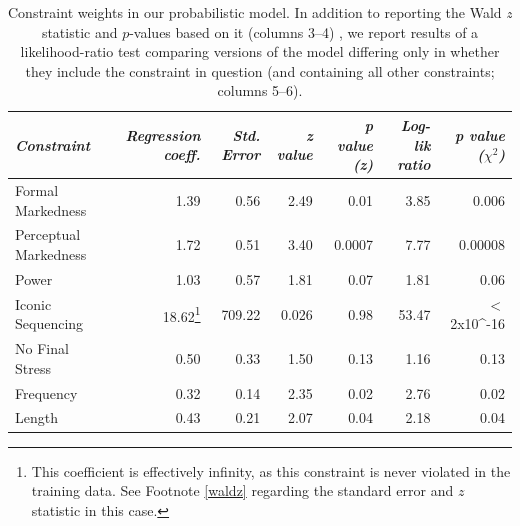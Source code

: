 \documentclass[authoryear]{elsarticle}
\begin{document}
\begin{table}[t]
\begin{minipage}[t]{\textwidth}


\renewcommand*\footnoterule{}


\centering
\begin{tabular}{ l  r  r  r  r r r }
\hline\hline
\emph{Constraint} & \emph{Regression coeff.} &\emph{Std. Error} & \emph{z value} & \emph{p value (z)} & \emph{Log-lik ratio} & \emph{p value ($\chi^{2}$)}\\\hline    
 Formal Markedness   & 1.39     & 0.56   & 2.49  & 0.01 & 3.85 & 0.006  \\ 
Perceptual Markedness   & 1.72     & 0.51  &  3.40 &  0.0007& 7.77 & 0.00008    \\ 
 Power &     1.03 &     0.57&    1.81 &  0.07& 1.81 & 0.06     \\
Iconic Sequencing  &    18.62\footnote{This coefficient is effectively infinity, as this constraint is never violated in the training data. See Footnote \ref{waldz} regarding the standard error and $z$ statistic in this case.} &   709.22  &  0.026 &  0.98&   53.47 & $<$2x10^{-16}    \\
 No Final Stress   &    0.50   &   0.33 &   1.50&   0.13 & 1.16 & 0.13      \\
 Frequency   &    0.32    &  0.14 &   2.35  & 0.02& 2.76 & 0.02     \\  
 Length  &    0.43  &    0.21 &   2.07 &  0.04& 2.18  & 0.04    \\  \hline
\end{tabular}
\end{minipage}
\caption{Constraint weights in our probabilistic model. In addition to reporting the Wald \emph{z} statistic and $p$-values based on it (columns 3--4) , we report results of a likelihood-ratio test comparing versions of the model differing only in whether they include the constraint in question (and containing all other constraints; columns 5--6).}\label{t:weights}

\end{table} 

\end{document}

